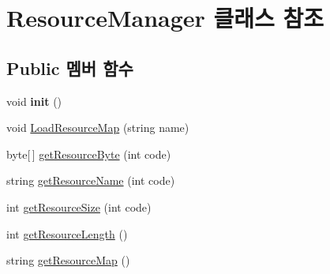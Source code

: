\hypertarget{class_resource_manager}{}\section{Resource\+Manager 클래스 참조}
\label{class_resource_manager}
\subsection*{Public 멤버 함수}
\begin{DoxyCompactItemize}
\item 
\hypertarget{class_resource_manager_a0977694caba2ac744775ab1d7dd67223}{}void {\bfseries init} ()\label{class_resource_manager_a0977694caba2ac744775ab1d7dd67223}

\item 
void \hyperlink{class_resource_manager_a9708efe73c033a8bb4edbe86897b358e}{Load\+Resource\+Map} (string name)
\item 
byte\mbox{[}$\,$\mbox{]} \hyperlink{class_resource_manager_adf0cc85df80ca48a2b9de8b8726908c1}{get\+Resource\+Byte} (int code)
\item 
string \hyperlink{class_resource_manager_a4c9274aa6ad2fddd6430332b6d422e20}{get\+Resource\+Name} (int code)
\item 
int \hyperlink{class_resource_manager_a326e4f9a9bd90de1dc598fc7fcf06f9c}{get\+Resource\+Size} (int code)
\item 
int \hyperlink{class_resource_manager_a79ffae0cb55cf2d7efa0c3f4211d5cc6}{get\+Resource\+Length} ()
\item 
string \hyperlink{class_resource_manager_ac24c8489e48334f42d652439ae0c258b}{get\+Resource\+Map} ()
\end{DoxyCompactItemize}
